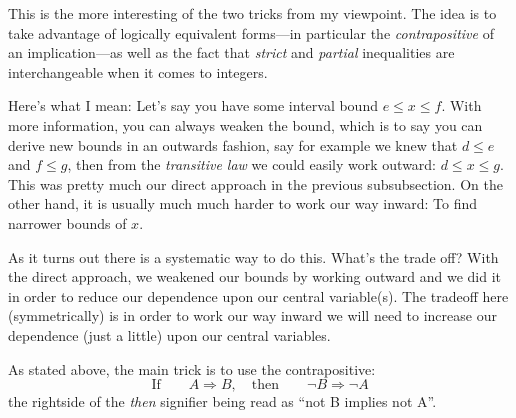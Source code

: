 \documentclass[twoside]{article}
\begin{document}
This is the more interesting of the two tricks from my viewpoint. The idea is to take advantage of logically equivalent
forms---in particular the \emph{contrapositive} of an implication---as well as the fact that \emph{strict} and \emph{partial}
inequalities are interchangeable when it comes to integers.

Here's what I mean: Let's say you have some interval bound $ e\le x\le f $. With more information, you can always weaken the bound,
which is to say you can derive new bounds in an outwards fashion, say for example we knew that $ d\le e $ and $ f\le g $, then
from the \emph{transitive law} we could easily work outward: $ d\le x\le g $. This was pretty much our direct approach in the
previous subsubsection. On the other hand, it is usually much much harder to work our way inward: To find narrower bounds of $ x $.

As it turns out there is a systematic way to do this. What's the trade off? With the direct approach, we weakened our bounds
by working outward and we did it in order to reduce our dependence upon our central variable(s). The tradeoff here (symmetrically)
is in order to work our way inward we will need to increase our dependence (just a little) upon our central variables.

As stated above, the main trick is to use the contrapositive:
$$ \mbox{If}\qquad A\Longrightarrow B,\quad\mbox{then}\qquad\neg B\Longrightarrow\neg A $$
the rightside of the \emph{then} signifier being read as ``not B implies not A''.
\end{document}
